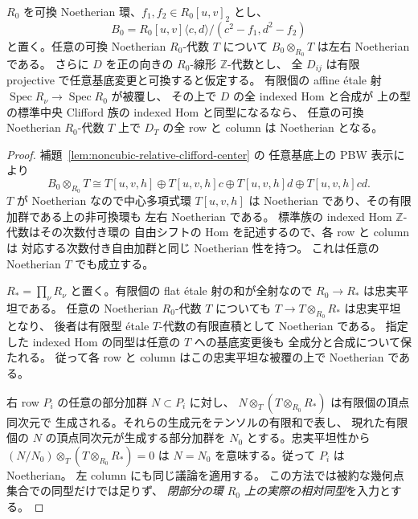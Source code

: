 \begin{lemma}
\label{lem:closed-clifford-fpqc-noetherian}
$R_0$ を可換 Noetherian 環、$f_1,f_2\in R_0[u,v]_2$ とし、
\[
 B_0=R_0[u,v]\langle c,d\rangle/(c^2-f_1,d^2-f_2)
\]
と置く。任意の可換 Noetherian $R_0$-代数 $T$ について
$B_0\otimes_{R_0}T$ は左右 Noetherian である。
さらに $D$ を正の向きの $R_0$-線形 $\mathbb Z$-代数とし、
全 $D_{ij}$ は有限 projective で任意基底変更と可換すると仮定する。
有限個の affine \texorpdfstring{\'etale}{etale} 射
$\operatorname{Spec}R_\nu\to\operatorname{Spec}R_0$ が被覆し、
その上で $D$ の全 indexed Hom と合成が
上の型の標準中央 Clifford 族の indexed Hom と同型になるなら、
任意の可換 Noetherian $R_0$-代数 $T$ 上で
$D_T$ の全 row と column は Noetherian となる。
\end{lemma}
\begin{proof}
補題~\ref{lem:noncubic-relative-clifford-center} の
任意基底上の PBW 表示により
\[
 B_0\otimes_{R_0}T
 \cong T[u,v,h]\oplus T[u,v,h]c
                  \oplus T[u,v,h]d\oplus T[u,v,h]cd.
\]
$T$ が Noetherian なので中心多項式環 $T[u,v,h]$ は
Noetherian であり、その有限加群である上の非可換環も
左右 Noetherian である。
標準族の indexed Hom $\mathbb Z$-代数はその次数付き環の
自由シフトの Hom を記述するので、各 row と column は
対応する次数付き自由加群と同じ Noetherian 性を持つ。
これは任意の Noetherian $T$ でも成立する。

$R_*=\prod_\nu R_\nu$ と置く。有限個の flat \'{e}tale
射の和が全射なので $R_0\to R_*$ は忠実平坦である。
任意の Noetherian $R_0$-代数 $T$ についても
$T\to T\otimes_{R_0}R_*$ は忠実平坦となり、
後者は有限型 \'{e}tale $T$-代数の有限直積として
Noetherian である。
指定した indexed Hom の同型は任意の $T$ への基底変更後も
全成分と合成について保たれる。
従って各 row と column はこの忠実平坦な被覆の上で
Noetherian である。

右 row $P_i$ の任意の部分加群 $N\subset P_i$ に対し、
$N\otimes_T(T\otimes_{R_0}R_*)$ は有限個の頂点同次元で
生成される。それらの生成元をテンソルの有限和で表し、
現れた有限個の $N$ の頂点同次元が生成する部分加群を
$N_0$ とする。忠実平坦性から
$(N/N_0)\otimes_T(T\otimes_{R_0}R_*)=0$ は $N=N_0$
を意味する。従って $P_i$ は Noetherian。
左 column にも同じ議論を適用する。
この方法では被約な幾何点集合での同型だけでは足りず、
\emph{閉部分の環 $R_0$ 上の実際の相対同型}を入力とする。
\end{proof}

